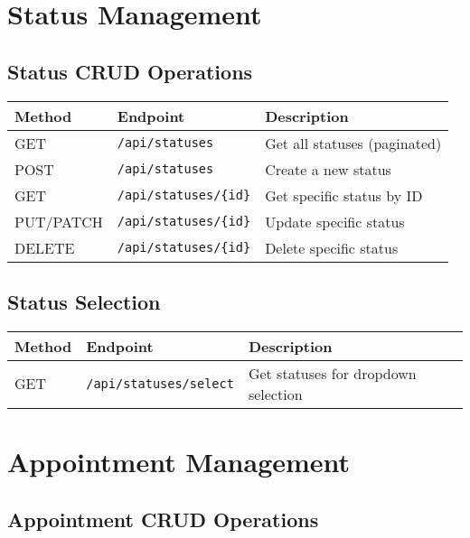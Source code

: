 \documentclass[12pt,a4paper]{article}
\begin{document}
\section{Status Management}

\subsection{Status CRUD Operations}

\begin{longtable}{|p{}|p{}|p{}|}
\hline
\textbf{Method} & \textbf{Endpoint} & \textbf{Description} \\
\hline
\endhead

GET & \texttt{/api/statuses} & Get all statuses (paginated) \\
POST & \texttt{/api/statuses} & Create a new status \\
GET & \texttt{/api/statuses/\{id\}} & Get specific status by ID \\
PUT/PATCH & \texttt{/api/statuses/\{id\}} & Update specific status \\
DELETE & \texttt{/api/statuses/\{id\}} & Delete specific status \\
\hline
\end{longtable}

\subsection{Status Selection}

\begin{longtable}{|p{}|p{}|p{}|}
\hline
\textbf{Method} & \textbf{Endpoint} & \textbf{Description} \\
\hline
\endhead

GET & \texttt{/api/statuses/select} & Get statuses for dropdown selection \\
\hline
\end{longtable}

\section{Appointment Management}

\subsection{Appointment CRUD Operations}
\end{document}
